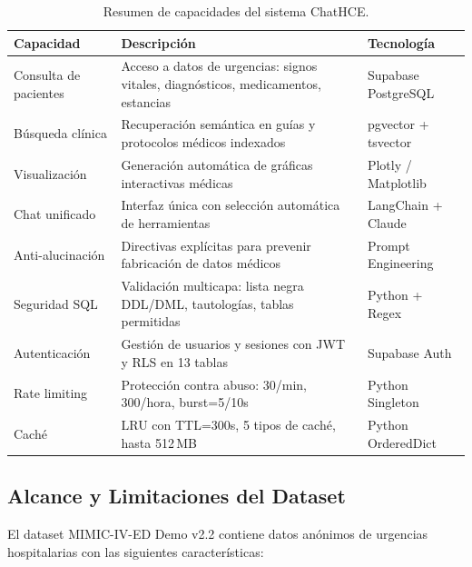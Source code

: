 ﻿\documentclass[11pt,a4paper]{article}
\begin{document}
\begin{table}[H]
\centering
\caption{Resumen de capacidades del sistema ChatHCE.}
\label{tab:capacidades}
\begin{tabularx}{\textwidth}{lXl}
\toprule
\textbf{Capacidad} & \textbf{Descripci\'on} & \textbf{Tecnolog\'ia} \\
\midrule
Consulta de pacientes & Acceso a datos de urgencias: signos vitales, diagn\'osticos, medicamentos, estancias & Supabase PostgreSQL \\
\addlinespace
B\'usqueda cl\'inica & Recuperaci\'on sem\'antica en gu\'ias y protocolos m\'edicos indexados & pgvector + tsvector \\
\addlinespace
Visualizaci\'on & Generaci\'on autom\'atica de gr\'aficas interactivas m\'edicas & Plotly / Matplotlib \\
\addlinespace
Chat unificado & Interfaz \'unica con selecci\'on autom\'atica de herramientas & LangChain + Claude \\
\addlinespace
Anti-alucinaci\'on & Directivas expl\'icitas para prevenir fabricaci\'on de datos m\'edicos & Prompt Engineering \\
\addlinespace
Seguridad SQL & Validaci\'on multicapa: lista negra DDL/DML, tautolog\'ias, tablas permitidas & Python + Regex \\
\addlinespace
Autenticaci\'on & Gesti\'on de usuarios y sesiones con JWT y RLS en 13 tablas & Supabase Auth \\
\addlinespace
Rate limiting & Protecci\'on contra abuso: 30/min, 300/hora, burst=5/10s & Python Singleton \\
\addlinespace
Cach\'e & LRU con TTL=300s, 5 tipos de cach\'e, hasta 512\,MB & Python OrderedDict \\
\bottomrule
\end{tabularx}
\end{table}

\subsection{Alcance y Limitaciones del Dataset}

El dataset MIMIC-IV-ED Demo v2.2 contiene datos an\'onimos de urgencias hospitalarias con las siguientes caracter\'isticas:
\end{document}
